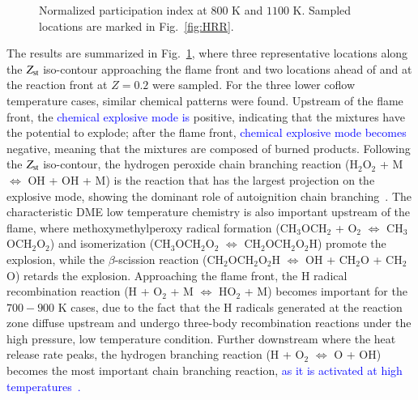 \documentclass[review,3p,times]{elsarticle}
\begin{document}
\begin{figure}
  \centering
  \scriptsize
  
  
  \normalsize
  \caption{Normalized participation index at $800$ K and $1100$ K.  Sampled locations are marked in Fig.~\ref{fig:HRR}.}
  \label{fig:CEMA}
\end{figure}


The results are summarized in Fig.~\ref{fig:CEMA}, where three representative locations along the $Z_{\rm st}$ iso-contour approaching the flame front and two locations ahead of and at the reaction front at $Z = 0.2$ were sampled.  For the three lower coflow temperature cases, similar chemical patterns were found.  Upstream of the flame front, the \textcolor{blue}{chemical explosive mode is} positive, indicating that the mixtures have the potential to explode; after the flame front, \textcolor{blue}{chemical explosive mode becomes} negative, meaning that the mixtures are composed of burned products.  Following the $Z_{\rm st}$ iso-contour, the hydrogen peroxide chain branching reaction (H$_2$O$_2$ + M $\Longleftrightarrow$ OH + OH + M) is the reaction that has the largest projection on the explosive mode, showing the dominant role of autoignition chain branching\textcolor{blue}{~\cite{westbrook00}}.  The characteristic DME low temperature chemistry is also important upstream of the flame, where methoxymethylperoxy radical formation (CH$_3$OCH$_2$ + O$_2$ $\Longleftrightarrow$ CH$_3$OCH$_2$O$_2$) and isomerization (CH$_3$OCH$_2$O$_2$ $\Longleftrightarrow$ CH$_2$OCH$_2$O$_2$H) promote the explosion, while the $\beta$-scission reaction (CH$_2$OCH$_2$O$_2$H $\Longleftrightarrow$ OH + CH$_2$O + CH$_2$O) retards the explosion.  Approaching the flame front, the H radical recombination reaction (H + O$_2$ + M $\Longleftrightarrow$ HO$_2$ + M) becomes important for the $700-900$ K cases, due to the fact that the H radicals generated at the reaction zone diffuse upstream and undergo three-body recombination reactions under the high pressure, low temperature condition.  Further downstream where the heat release rate peaks, the hydrogen branching reaction (H + O$_2$ $\Longleftrightarrow$ O + OH) becomes the most important chain branching reaction, \textcolor{blue}{as it is activated at high temperatures~\cite{westbrook00}.}

\end{document}
